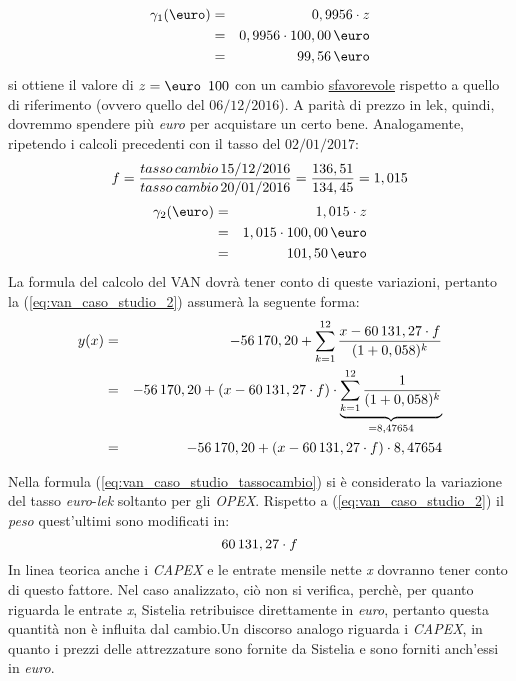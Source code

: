 \begin{eqnarray}
\label{eq:euro_example1}
	\gamma _1 (\mbox{\euro})& = & 0,9956 \cdot z 	\nonumber \\
			  & = & 0,9956 \cdot 100,00 \thinspace \mbox{\euro} \nonumber \\
			  & = & 99,56 \thinspace \mbox{\euro}
\end{eqnarray}
si ottiene il valore di $z = \mbox{\euro \thinspace 100}$ con un cambio \underline{sfavorevole} rispetto a quello di riferimento (ovvero quello del $06/12/2016$). A parità di prezzo in lek, quindi, dovremmo spendere più \textit{euro} per acquistare un certo bene.\newline
Analogamente, ripetendo i calcoli precedenti con il tasso del $02/01/2017$:
\begin{equation}
\label{eq:example_2_fattore_aggiustamento}
\begin{split}
	f = \frac{tasso \thinspace cambio \thinspace 15/12/2016}{tasso \thinspace cambio \thinspace 20/01/2016} = \frac{136,51}{134,45} = 1,015
\end{split}
\end{equation}
\begin{eqnarray}
\label{eq:euro_example2}
	\gamma _2 (\mbox{\euro})& = & 1,015 \cdot z 	\nonumber \\
			  & = & 1,015 \cdot 100,00 \thinspace \mbox{\euro} \nonumber \\
			  & = & 101,50 \thinspace \mbox{\euro}
\end{eqnarray}
La formula del calcolo del VAN dovrà tener conto di queste variazioni, pertanto la (\ref{eq:van_caso_studio_2}) assumerà la seguente forma:
	\begin{eqnarray}
	\label{eq:van_caso_studio_tassocambio}
 		y(x) & = & - 56\thinspace 170,20 + \sum_{k=1}^{12} \frac{x - 60\thinspace 131,27 \cdot f}{(1+0,058)^k} \nonumber \\
 		 & = & -56\thinspace 170,20 + (x - 60\thinspace 131,27 \cdot f) \cdot \underbrace{\sum_{k=1}^{12} \frac{1} {(1+0,058)^{k}}}_{{}=8,47654} \nonumber \\
 		 & = & -56\thinspace 170,20 + (x - 60\thinspace 131,27 \cdot f) \cdot 8,47654		
	\end{eqnarray}  		

	\begin{tcolorbox}[colframe=blue!75!black,adjusted title=\textbf{Osservazione!}]
		Nella formula (\ref{eq:van_caso_studio_tassocambio}) si è considerato la variazione del tasso \emph{euro}-\emph{lek} soltanto per gli \emph{\ac{OPEX}}. \newline Rispetto a (\ref{eq:van_caso_studio_2}) il \emph{peso} quest'ultimi sono modificati in:
		\[ 60\thinspace 131,27 \cdot f \] 
	In linea teorica anche i \emph{\ac{CAPEX}} e le entrate mensile nette \emph{x} dovranno tener conto di questo fattore. Nel caso analizzato, ciò non si verifica, perchè, per quanto riguarda le entrate \emph{x}, Sistelia retribuisce direttamente in \emph{euro}, pertanto questa quantità non è influita dal cambio.\newline Un discorso analogo riguarda i \emph{\ac{CAPEX}}, in quanto i prezzi delle attrezzature sono fornite da Sistelia e sono forniti anch'essi in \emph{euro}.
	\end{tcolorbox} 
